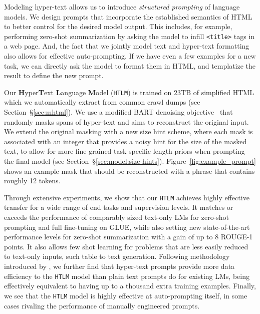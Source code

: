 \documentclass[11pt,a4paper]{article}
\newcommand{\HTLM}{\texttt{HTLM}}
\begin{document}
Modeling hyper-text allows us to introduce \emph{structured prompting} of language models. We design prompts that incorporate the established semantics of HTML to better control for the desired model output. This includes, for example, performing zero-shot summarization by asking the model to infill \verb+<title>+ tags in a web page. And, the fact that we jointly model text and hyper-text formatting also allows for effective auto-prompting. If we have even a few examples for a new task, we can directly ask the model to format them in HTML, and templatize the result to define the new prompt. 

Our \textbf{H}yper\textbf{T}ext \textbf{L}anguage \textbf{M}odel (\HTLM{}) is trained on 23TB of simplified HTML which we automatically extract from common crawl dumps (see Section~\S\ref{sec:mhtml}). We use a modified BART denoising objective~\cite{BART} that randomly masks spans of hyper-text and aims to reconstruct the original input. We extend the original masking with a new size hint scheme, where each mask is associated with an integer that provides a noisy hint for the size of the masked text, to allow for more fine grained task-specific length priors when prompting the final model (see Section~\S\ref{sec:model:size-hints}). Figure~\ref{fig:example_prompt} shows an example mask that should be reconstructed with a phrase that contains roughly 12 tokens. 

Through extensive experiments, we show that our \HTLM{} achieves highly effective transfer for a wide range of end tasks and supervision levels. 
It matches or exceeds the performance of comparably sized text-only LMs for zero-shot prompting and full fine-tuning on GLUE, while also setting new state-of-the-art performance levels for zero-shot summarization with a gain of up to 8 ROUGE-1 points. 
It also allows few shot learning for problems that are less easily reduced to text-only inputs, such table to text generation. Following methodology introduced by \citet{how_many_datapoints}, we further find that hyper-text prompts provide more data efficiency to the \HTLM{} model than plain text prompts do for existing LMs, being effectively equivalent to having up to a thousand extra training examples. Finally, we see that the \HTLM{} model is highly effective at auto-prompting itself, in some cases rivaling the performance of manually engineered prompts. 
\end{document}
